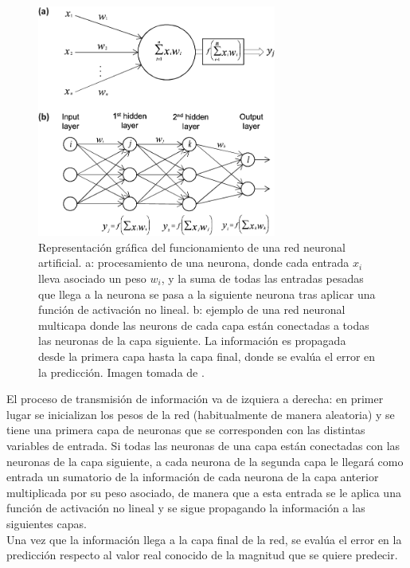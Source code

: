 \begin{figure}[h]
\centering
\includegraphics[width=0.70\textwidth]{figures/a-The-building-block-of-deep-neural-networks-artificial-neuron-or-node-Each-input-x.png}
\caption{Representaci\'on gr\'afica del funcionamiento de una red neuronal artificial. a: procesamiento de una neurona, donde cada entrada $x_{i}$ lleva asociado un peso $w_{i}$, y la suma de todas las entradas pesadas que llega a la neurona se pasa a la siguiente neurona tras aplicar una funci\'on de activaci\'on no lineal. b: ejemplo de una red neuronal multicapa donde las neurons de cada capa est\'an conectadas a todas las neuronas de la capa siguiente. La informaci\'on es propagada desde la primera capa hasta la capa final, donde se eval\'ua el error en la predicci\'on. Imagen tomada de \cite{Vieira2017}.}
\label{fig:ann}
\end{figure}

El proceso de transmisi\'on de informaci\'on va de izquiera a derecha: en primer lugar se inicializan los pesos de la red (habitualmente de manera aleatoria) y se tiene una primera capa de neuronas que se corresponden con las distintas variables de entrada. Si todas las neuronas de una capa est\'an conectadas con las neuronas de la capa siguiente, a cada neurona de la segunda capa le llegar\'a como entrada un sumatorio de la informaci\'on de cada neurona de la capa anterior multiplicada por su peso asociado, de manera que a esta entrada se le aplica una funci\'on de activaci\'on no lineal y se sigue propagando la informaci\'on a las siguientes capas. \\
Una vez que la informaci\'on llega a la capa final de la red, se eval\'ua el error en la predicci\'on respecto al valor real conocido de la magnitud que se quiere predecir. \\


